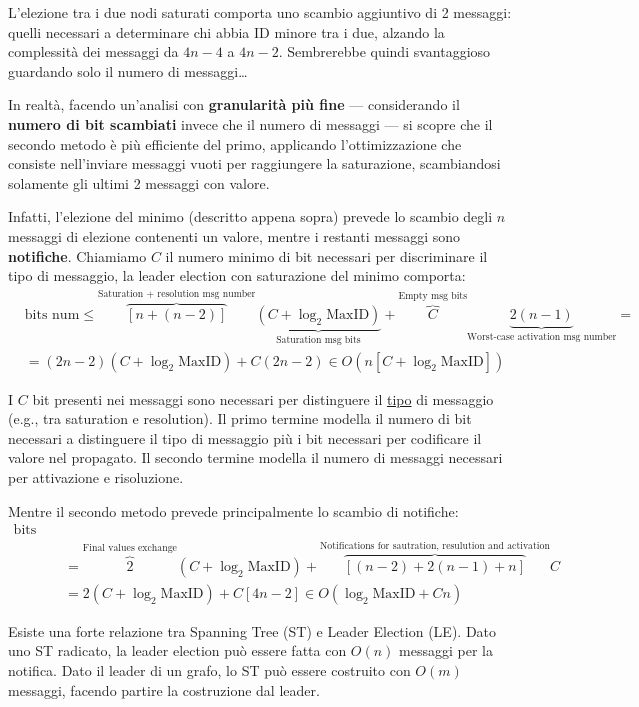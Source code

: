 L'elezione tra i due nodi saturati comporta uno scambio aggiuntivo di 2 messaggi: quelli necessari a determinare chi abbia ID minore
tra i due, alzando la complessità dei messaggi da $4n-4$ a $4n-2$. Sembrerebbe quindi svantaggioso guardando solo il numero di messaggi\dots

In realtà, facendo un'analisi con \textbf{granularità più fine} --- considerando il \textbf{numero di bit scambiati} invece che il numero di messaggi ---
si scopre che il secondo metodo è più efficiente del primo, applicando l'ottimizzazione che consiste nell'inviare messaggi vuoti per
raggiungere la saturazione, scambiandosi solamente gli ultimi 2 messaggi con valore.

Infatti, l'elezione del minimo (descritto appena sopra) prevede lo scambio degli $n$ messaggi di elezione contenenti un valore,
mentre i restanti messaggi sono \textbf{notifiche}.
Chiamiamo $C$ il numero minimo di bit necessari per discriminare il tipo di messaggio, la leader election con saturazione del minimo
comporta:
\begin{align*}
& \text{bits num} \leq
\overbrace{[n + (n-2)]}^\text{Saturation + resolution msg number}
\underbrace{(C + \log_2 \text{MaxID})}_\text{Saturation msg bits} +
\overbrace{C}^\text{Empty msg bits}
\underbrace{2(n-1)}_\text{Worst-case activation msg number} = \\
& = (2n-2) (C + \log_2 \text{MaxID}) + C (2n-2) \in O(n [C + \log_2 \text{MaxID}])
\end{align*}

I $C$ bit presenti nei messaggi sono necessari per distinguere il \underline{tipo} di messaggio (e.g., tra saturation e resolution).
Il primo termine modella il numero di bit necessari a distinguere il tipo di messaggio più i bit necessari 
per codificare il valore nel propagato.
Il secondo termine modella il numero di messaggi necessari per attivazione e risoluzione.

Mentre il secondo metodo prevede principalmente lo scambio di notifiche: 
\begin{align*}
\text{bits num} & \\
& = \overbrace{2}^\text{Final values exchange} (C + \log_2 \text{MaxID}) +
\overbrace{[(n-2) + 2(n-1) + n]}^\text{Notifications for sautration, resulution and activation} C \\
& = 2 (C + \log_2 \text{MaxID}) + C [4n - 2] \in O(\log_2 \text{MaxID} + Cn)
\end{align*}

Esiste una forte relazione tra Spanning Tree (ST) e Leader Election (LE).
Dato uno ST radicato, la leader election può essere fatta con $O(n)$ messaggi per la notifica.
Dato il leader di un grafo, lo ST può essere costruito con $O(m)$ messaggi, facendo partire la costruzione dal leader.

